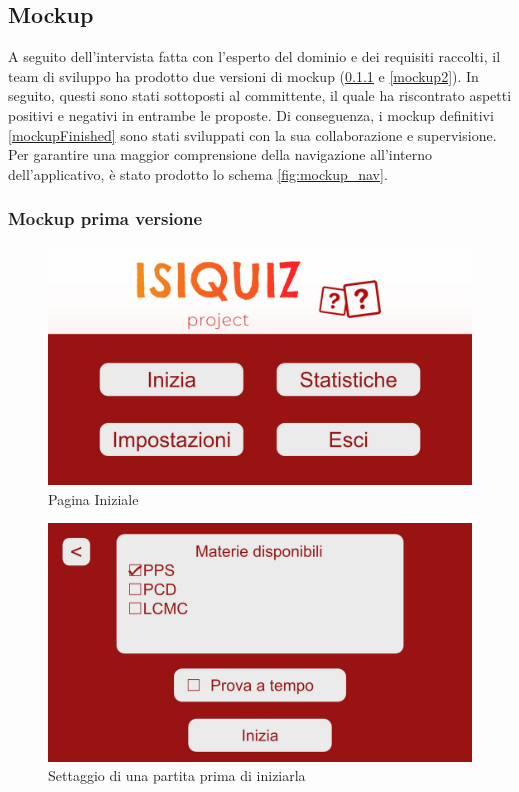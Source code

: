         \subsection{Mockup}
    	A seguito dell'intervista fatta con l'esperto del dominio e dei requisiti raccolti, il team di sviluppo ha prodotto due versioni di mockup (\ref{mockup1} e \ref{mockup2}). In seguito, questi sono stati sottoposti al committente, il quale ha riscontrato aspetti positivi e negativi in entrambe le proposte. Di conseguenza, i mockup definitivi \ref{mockupFinished} sono stati sviluppati con la sua collaborazione e supervisione. Per garantire una maggior comprensione della navigazione all'interno dell'applicativo, è stato prodotto lo schema \ref{fig:mockup_nav}.

        \subsubsection{Mockup prima versione}\label{mockup1}
        \begin{figure}[H]
            \centering
            \includegraphics[width=\textwidth]{Images/mockup/home1.jpg}
            \caption{Pagina Iniziale}
            \label{fig:HomePage1}
        \end{figure}
        
        \begin{figure}[H]
            \centering
            \includegraphics[width=\textwidth]{Images/mockup/start1.jpg}
            \caption{Settaggio di una partita prima di iniziarla}
            \label{fig:Start1}
        \end{figure}
          
